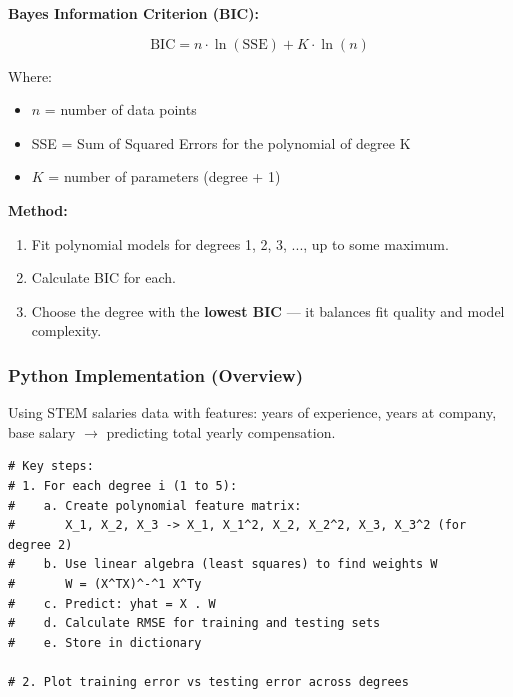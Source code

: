\documentclass[12pt,openany]{book}
\begin{document}
\textbf{Bayes Information Criterion (BIC):}

\[
\text{BIC} = n \cdot \ln(\text{SSE}) + K \cdot \ln(n)
\]


Where:
\begin{itemize}[leftmargin=*]
    \item \(n\) = number of data points
    \item SSE = Sum of Squared Errors for the polynomial of degree K
    \item \(K\) = number of parameters (degree + 1)

\end{itemize}

\textbf{Method:}
\begin{enumerate}[leftmargin=*]
    \item Fit polynomial models for degrees 1, 2, 3, ..., up to some maximum.
    \item Calculate BIC for each.
    \item Choose the degree with the \textbf{lowest BIC} --- it balances fit quality and model complexity.

\end{enumerate}


\begin{center}
\end{center}



\subsubsection{Python Implementation (Overview)}


Using STEM salaries data with features: years of experience, years at company, base salary \(\rightarrow\) predicting total yearly compensation.

\begin{Verbatim}[breaklines=true,fontsize=\small]
# Key steps:
# 1. For each degree i (1 to 5):
#    a. Create polynomial feature matrix:
#       X_1, X_2, X_3 -> X_1, X_1^2, X_2, X_2^2, X_3, X_3^2 (for degree 2)
#    b. Use linear algebra (least squares) to find weights W
#       W = (X^TX)^-^1 X^Ty
#    c. Predict: yhat = X . W
#    d. Calculate RMSE for training and testing sets
#    e. Store in dictionary

# 2. Plot training error vs testing error across degrees
\end{Verbatim}
\end{document}
